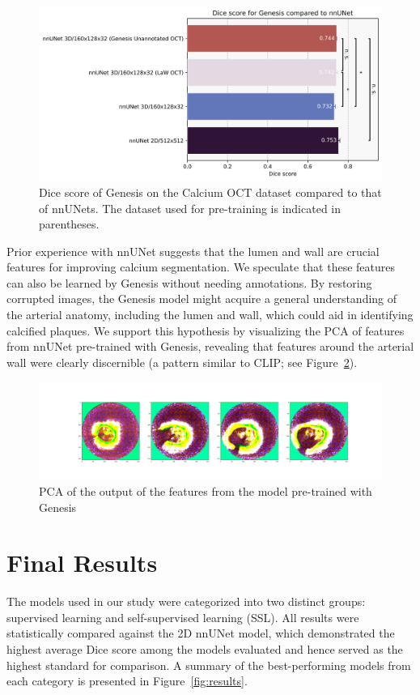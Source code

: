 \documentclass[a4paper,11pt,oneside]{report}
\begin{document}
\begin{figure}[h]
    \centering
    \includegraphics[width=0.65\linewidth]{figures/result_nnUNet_and_Genesis_results.png}
    \caption{Dice score of Genesis on the Calcium OCT dataset compared to that of nnUNets. The dataset used for pre-training is indicated in parentheses.
    }
    \label{fig:genesis-results}    
\end{figure}

Prior experience with nnUNet suggests that the lumen and wall are crucial features for improving calcium segmentation. We speculate that these features can also be learned by Genesis without needing annotations. By restoring corrupted images, the Genesis model might acquire a general understanding of the arterial anatomy, including the lumen and wall, which could aid in identifying calcified plaques. We support this hypothesis by visualizing the PCA of features from nnUNet pre-trained with Genesis, revealing that features around the arterial wall were clearly discernible (a pattern similar to CLIP; see Figure~\ref{fig:pca-genesis}). 

\begin{figure}[h]
    \centering
    \includegraphics[width=0.5\linewidth]{figures/discussion_genesis_feature_map_batch0_feature1.png}
    \caption{PCA of the output of the features from the model pre-trained with Genesis}
    \label{fig:pca-genesis}
\end{figure}


\section{Final Results}
The models used in our study were categorized into two distinct groups: supervised learning and self-supervised learning (SSL). All results were statistically compared against the 2D nnUNet model, which demonstrated the highest average Dice score among the models evaluated and hence served as the highest standard for comparison. A summary of the best-performing models from each category is presented in Figure~\ref{fig:results}.
\end{document}

